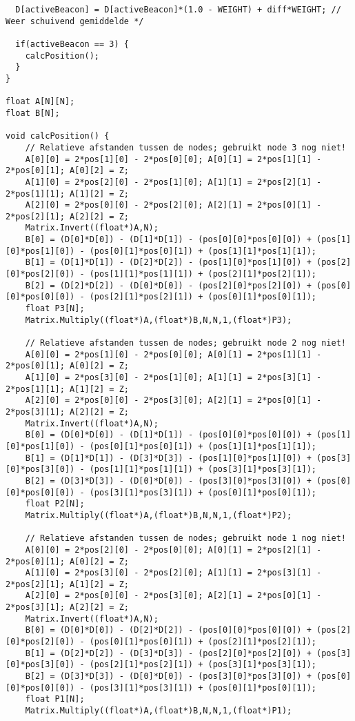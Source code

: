 \begin{lstlisting}
  D[activeBeacon] = D[activeBeacon]*(1.0 - WEIGHT) + diff*WEIGHT; // Weer schuivend gemiddelde */

  if(activeBeacon == 3) {
    calcPosition();
  }
}

float A[N][N];
float B[N];

void calcPosition() {
    // Relatieve afstanden tussen de nodes; gebruikt node 3 nog niet!
    A[0][0] = 2*pos[1][0] - 2*pos[0][0]; A[0][1] = 2*pos[1][1] - 2*pos[0][1]; A[0][2] = Z;
    A[1][0] = 2*pos[2][0] - 2*pos[1][0]; A[1][1] = 2*pos[2][1] - 2*pos[1][1]; A[1][2] = Z;
    A[2][0] = 2*pos[0][0] - 2*pos[2][0]; A[2][1] = 2*pos[0][1] - 2*pos[2][1]; A[2][2] = Z;
    Matrix.Invert((float*)A,N);
    B[0] = (D[0]*D[0]) - (D[1]*D[1]) - (pos[0][0]*pos[0][0]) + (pos[1][0]*pos[1][0]) - (pos[0][1]*pos[0][1]) + (pos[1][1]*pos[1][1]);
    B[1] = (D[1]*D[1]) - (D[2]*D[2]) - (pos[1][0]*pos[1][0]) + (pos[2][0]*pos[2][0]) - (pos[1][1]*pos[1][1]) + (pos[2][1]*pos[2][1]);
    B[2] = (D[2]*D[2]) - (D[0]*D[0]) - (pos[2][0]*pos[2][0]) + (pos[0][0]*pos[0][0]) - (pos[2][1]*pos[2][1]) + (pos[0][1]*pos[0][1]);
    float P3[N];
    Matrix.Multiply((float*)A,(float*)B,N,N,1,(float*)P3);    

    // Relatieve afstanden tussen de nodes; gebruikt node 2 nog niet!
    A[0][0] = 2*pos[1][0] - 2*pos[0][0]; A[0][1] = 2*pos[1][1] - 2*pos[0][1]; A[0][2] = Z;
    A[1][0] = 2*pos[3][0] - 2*pos[1][0]; A[1][1] = 2*pos[3][1] - 2*pos[1][1]; A[1][2] = Z;
    A[2][0] = 2*pos[0][0] - 2*pos[3][0]; A[2][1] = 2*pos[0][1] - 2*pos[3][1]; A[2][2] = Z;
    Matrix.Invert((float*)A,N);
    B[0] = (D[0]*D[0]) - (D[1]*D[1]) - (pos[0][0]*pos[0][0]) + (pos[1][0]*pos[1][0]) - (pos[0][1]*pos[0][1]) + (pos[1][1]*pos[1][1]);
    B[1] = (D[1]*D[1]) - (D[3]*D[3]) - (pos[1][0]*pos[1][0]) + (pos[3][0]*pos[3][0]) - (pos[1][1]*pos[1][1]) + (pos[3][1]*pos[3][1]);
    B[2] = (D[3]*D[3]) - (D[0]*D[0]) - (pos[3][0]*pos[3][0]) + (pos[0][0]*pos[0][0]) - (pos[3][1]*pos[3][1]) + (pos[0][1]*pos[0][1]);
    float P2[N];
    Matrix.Multiply((float*)A,(float*)B,N,N,1,(float*)P2);    
    
    // Relatieve afstanden tussen de nodes; gebruikt node 1 nog niet!
    A[0][0] = 2*pos[2][0] - 2*pos[0][0]; A[0][1] = 2*pos[2][1] - 2*pos[0][1]; A[0][2] = Z;
    A[1][0] = 2*pos[3][0] - 2*pos[2][0]; A[1][1] = 2*pos[3][1] - 2*pos[2][1]; A[1][2] = Z;
    A[2][0] = 2*pos[0][0] - 2*pos[3][0]; A[2][1] = 2*pos[0][1] - 2*pos[3][1]; A[2][2] = Z;
    Matrix.Invert((float*)A,N);
    B[0] = (D[0]*D[0]) - (D[2]*D[2]) - (pos[0][0]*pos[0][0]) + (pos[2][0]*pos[2][0]) - (pos[0][1]*pos[0][1]) + (pos[2][1]*pos[2][1]);
    B[1] = (D[2]*D[2]) - (D[3]*D[3]) - (pos[2][0]*pos[2][0]) + (pos[3][0]*pos[3][0]) - (pos[2][1]*pos[2][1]) + (pos[3][1]*pos[3][1]);
    B[2] = (D[3]*D[3]) - (D[0]*D[0]) - (pos[3][0]*pos[3][0]) + (pos[0][0]*pos[0][0]) - (pos[3][1]*pos[3][1]) + (pos[0][1]*pos[0][1]);
    float P1[N];
    Matrix.Multiply((float*)A,(float*)B,N,N,1,(float*)P1);    
    

\end{lstlisting}
